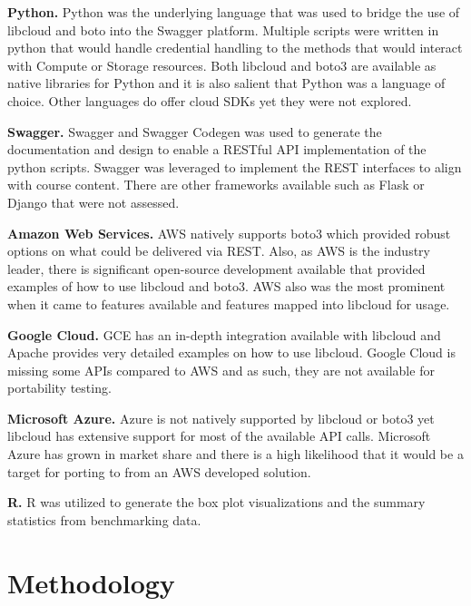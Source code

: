 \begin{description}

\item{\bf Python.} Python was the underlying language that was used to bridge
the use of libcloud and boto into the Swagger platform. Multiple scripts were
written in python that would handle credential handling to the methods that
would interact with Compute or Storage resources. Both libcloud and boto3 are
available as native libraries for Python and it is also salient that Python was
a language of choice. Other languages do offer cloud SDKs yet they were not
explored.
\item{\bf Swagger.} Swagger and Swagger Codegen was used to generate the
documentation and design to enable a RESTful API implementation of the python
scripts. Swagger was leveraged to implement the REST interfaces to
align with course content. There are other frameworks available such as Flask
or
Django that were not assessed.
\item{\bf Amazon Web Services.} AWS natively supports boto3 which provided
robust options on what could be delivered via REST. Also, as AWS is the
industry
leader, there is significant open-source development available that provided
examples of how to use libcloud and boto3. AWS also was the most prominent when
it came to features available and features mapped into libcloud for usage.
\item{\bf Google Cloud.} GCE has an in-depth integration available with
libcloud and Apache provides very detailed examples on how to use libcloud.
Google Cloud is missing some APIs compared to AWS and as such, they are not
available for portability testing.
\item{\bf Microsoft Azure.} Azure is not natively supported by libcloud or
boto3
yet libcloud has extensive support for most of the available API calls.
Microsoft Azure has grown in market share and there is a high likelihood that
it
would be a target for porting to from an AWS developed solution.

\item{\bf R.} R was utilized to generate the box plot visualizations and
the summary statistics from benchmarking data.


\end{description}

\section{Methodology}

